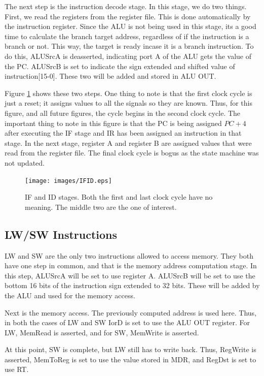 \documentclass[12pt, a4paper]{article}
\begin{document}
The next step is the instruction decode stage. In this stage, we do two things. First, we read the
registers from the register file. This is done automatically by the instruction register. Since the
ALU is not being used in this stage, its a good time to calculate the branch target address, regardless
of if the instruction is a branch or not. This way, the target is ready incase it is a branch instruction.
To do this, ALUSrcA is deasserted, indicating port A of the ALU gets the value of the PC. ALUSrcB is
set to indicate the sign extended and shifted value of instruction[15-0]. These two will be added
and stored in ALU OUT.

Figure \ref{fig:IFID} shows these two steps. One thing to note is that the first clock cycle is just a
reset; it assigns values to all the signals so they are known. Thus, for this figure, and all future figures,
the cycle begins in the second clock cycle. The important thing to note in this figure is that the PC
is being assigned $PC+4$ after executing the IF stage and IR has been assigned an instruction in that stage.
In the next stage, register A and register B are assigned values that were read from the register file. The
final clock cycle is bogus as the state machine was not updated.
\begin{figure}[h]
  \centering
  \texttt{[image: images/IFID.eps]}
  \caption{IF and ID stages. Both the first and last clock cycle have no meaning. The middle two are the one of
  interest.}
  \label{fig:IFID}
\end{figure}

\subsection{LW/SW Instructions}
LW and SW are the only two instructions allowed to access memory. They both have one step in common, and
that is the memory address computation stage. In this step, ALUSrcA will be set to use register A. 
ALUSrcB will be set to use the bottom 16 bits of the instruction sign extended to 32 bits. These will
be added by the ALU and used for the memory access.

Next is the memory access. The previously computed address is used here. Thus, in both the cases of
LW and SW IorD is set to use the ALU OUT register. For LW, MemRead is asserted, and for SW, MemWrite is
asserted.

At this point, SW is complete, but LW still has to write back. Thus, RegWrite is asserted, MemToReg is
set to use the value stored in MDR, and RegDst is set to use RT.
\end{document}
